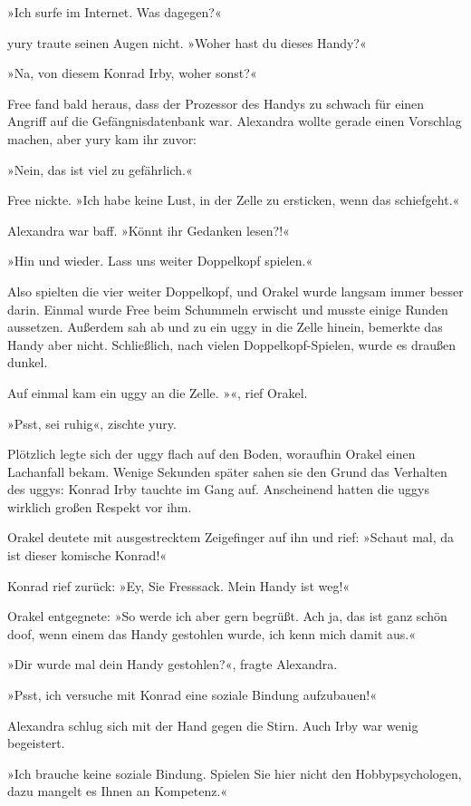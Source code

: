 »Ich surfe im Internet. Was dagegen?«

yury traute seinen Augen nicht. »Woher hast du dieses Handy?«

»Na, von diesem Konrad Irby, woher sonst?«

Free fand bald heraus, dass der Prozessor des Handys zu schwach für einen Angriff auf die Gefängnisdatenbank war. Alexandra wollte gerade einen Vorschlag machen, aber yury kam ihr zuvor:

»Nein, das ist viel zu gefährlich.«

Free nickte. »Ich habe keine Lust, in der Zelle zu ersticken, wenn das schiefgeht.«

Alexandra war baff. »Könnt ihr Gedanken lesen?!«

»Hin und wieder. Lass uns weiter Doppelkopf spielen.«

Also spielten die vier weiter Doppelkopf, und Orakel wurde langsam immer besser darin. Einmal wurde Free beim Schummeln erwischt und musste einige Runden aussetzen. Außerdem sah ab und zu ein uggy in die Zelle hinein, bemerkte das Handy aber nicht. Schließlich, nach vielen Doppelkopf-Spielen, wurde es draußen dunkel.

Auf einmal kam ein uggy an die Zelle. »«, rief Orakel.

»Psst, sei ruhig«, zischte yury.

Plötzlich legte sich der uggy flach auf den Boden, woraufhin Orakel einen Lachanfall bekam. Wenige Sekunden später sahen sie den Grund das Verhalten des uggys: Konrad Irby tauchte im Gang auf. Anscheinend hatten die uggys wirklich großen Respekt vor ihm.

Orakel deutete mit ausgestrecktem Zeigefinger auf ihn und rief: »Schaut mal, da ist dieser komische Konrad!«

Konrad rief zurück: »Ey, Sie Fresssack. Mein Handy ist weg!«

Orakel entgegnete: »So werde ich aber gern begrüßt. Ach ja, das ist ganz schön doof, wenn einem das Handy gestohlen wurde, ich kenn mich damit aus.«

»Dir wurde mal dein Handy gestohlen?«, fragte Alexandra.

»Psst, ich versuche mit Konrad eine soziale Bindung aufzubauen!«

Alexandra schlug sich mit der Hand gegen die Stirn. Auch Irby war wenig begeistert.

»Ich brauche keine soziale Bindung. Spielen Sie hier nicht den Hobbypsychologen, dazu mangelt es Ihnen an Kompetenz.«

